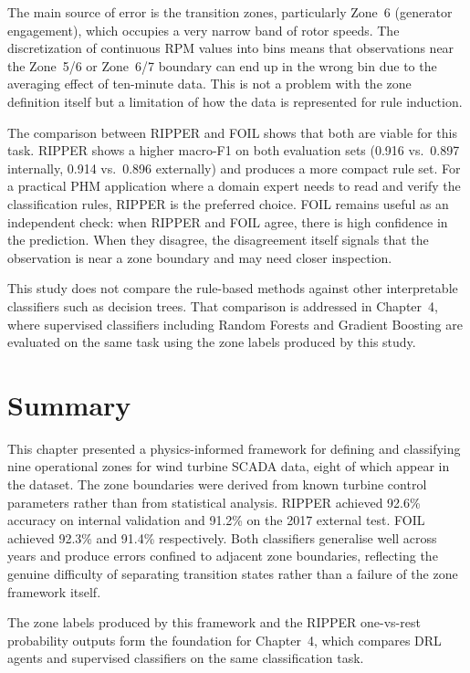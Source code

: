 The main source of error is the transition zones, particularly Zone~6 (generator
engagement), which occupies a very narrow band of rotor speeds. The discretization of
continuous RPM values into bins means that observations near the Zone~5/6 or Zone~6/7
boundary can end up in the wrong bin due to the averaging effect of ten-minute data. This
is not a problem with the zone definition itself but a limitation of how the data is
represented for rule induction.

The comparison between RIPPER and FOIL shows that both are viable for this task. RIPPER
shows a higher macro-F1 on both evaluation sets (0.916 vs.\ 0.897 internally, 0.914
vs.\ 0.896 externally) and produces a more compact rule set. For a practical PHM
application where a domain expert needs to read and verify the classification rules,
RIPPER is the preferred choice. FOIL remains useful as an independent check: when RIPPER
and FOIL agree, there is high confidence in the prediction. When they disagree, the
disagreement itself signals that the observation is near a zone boundary and may need
closer inspection.

This study does not compare the rule-based methods against other interpretable
classifiers such as decision trees. That comparison is addressed in Chapter~4, where
supervised classifiers including Random Forests and Gradient Boosting are evaluated on
the same task using the zone labels produced by this study.

\section{Summary}
\label{sec:ch3:summary}

This chapter presented a physics-informed framework for defining and classifying nine
operational zones for wind turbine SCADA data, eight of which appear in the dataset. The
zone boundaries were derived from known turbine control parameters rather than from
statistical analysis. RIPPER achieved 92.6\% accuracy on internal validation and 91.2\%
on the 2017 external test. FOIL achieved 92.3\% and 91.4\% respectively. Both classifiers
generalise well across years and produce errors confined to adjacent zone boundaries,
reflecting the genuine difficulty of separating transition states rather than a failure
of the zone framework itself.

The zone labels produced by this framework and the RIPPER one-vs-rest probability outputs
form the foundation for Chapter~4, which compares DRL agents and supervised classifiers
on the same classification task.
